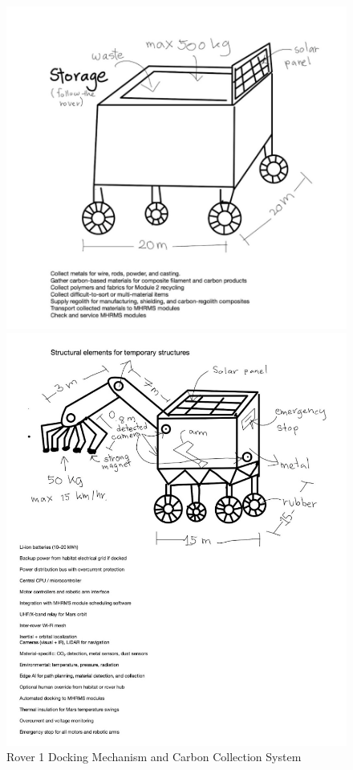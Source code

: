 \documentclass[12pt, a4paper]{article}
\begin{document}
\begin{figure}[H]
    \centering
    \begin{minipage}{0.45\textwidth}
        \centering
        \includegraphics[width=\textwidth]{rover1.png}
        \caption{Rover 1 Docking Mechanism and Carbon Collection System}
        \label{fig:rover1_design}
    \end{minipage}
    \hfill
    \begin{minipage}{0.45\textwidth}
        \centering
        \includegraphics[width=\textwidth]{rover2.png}

\end{minipage}
\end{figure}
\end{document}
